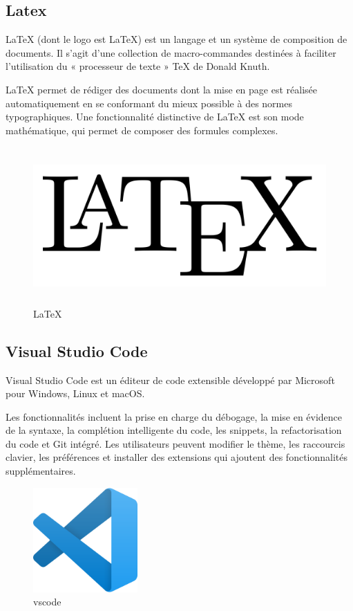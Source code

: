 \subsection{Latex}

LaTeX (dont le logo est \LaTeX) est un langage et un système de composition de documents. Il s'agit d'une collection de macro-commandes destinées à faciliter l'utilisation du « processeur de texte » TeX de Donald Knuth.

LaTeX permet de rédiger des documents dont la mise en page est réalisée automatiquement en se conformant du mieux possible à des normes typographiques. Une fonctionnalité distinctive de LaTeX est son mode mathématique, qui permet de composer des formules complexes.

\begin{figure}[!h]
\begin{center}
\includegraphics[height=6cm]{LaTeX.svg.png}
\end{center}
\caption{\LaTeX}
\end{figure}

\subsection{Visual Studio Code}

Visual Studio Code est un éditeur de code extensible développé par Microsoft pour Windows, Linux et macOS.

Les fonctionnalités incluent la prise en charge du débogage, la mise en évidence de la syntaxe, la complétion intelligente du code, les snippets, la refactorisation du code et Git intégré. Les utilisateurs peuvent modifier le thème, les raccourcis clavier, les préférences et installer des extensions qui ajoutent des fonctionnalités supplémentaires.

\begin{figure}[!h]
\begin{center}
\includegraphics[height=4cm]{vscode.svg.png}
\end{center}
\caption{vscode}
\end{figure}


